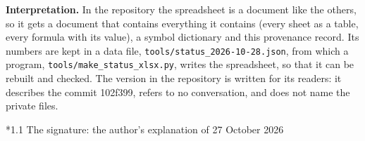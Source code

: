 \documentclass[10pt,a4paper]{article}
\makeatletter
\renewcommand\subsection{\@startsection{subsection}{2}{\z@}{-3.25ex\@plus -1ex \@minus -.2ex}{1.5ex \@plus .2ex}{\normalfont\large\bfseries\raggedright}}
\makeatother
\begin{document}
\textbf{Interpretation.} In the repository the spreadsheet is a document like the others, so it gets a document that contains everything it contains (every sheet as a table, every formula with its value), a symbol dictionary and this provenance record. Its numbers are kept in a data file, \texttt{tools/\allowbreak{}status\_\allowbreak{}2026-10-28.json}, from which a program, \texttt{tools/\allowbreak{}make\_\allowbreak{}status\_\allowbreak{}xlsx.py}, writes the spreadsheet, so that it can be rebuilt and checked. The version in the repository is written for its readers: it describes the commit 102f399, refers to no conversation, and does not name the private files.

\subsection*{1.1 The signature: the author’s explanation of 27 October 2026}
\end{document}
